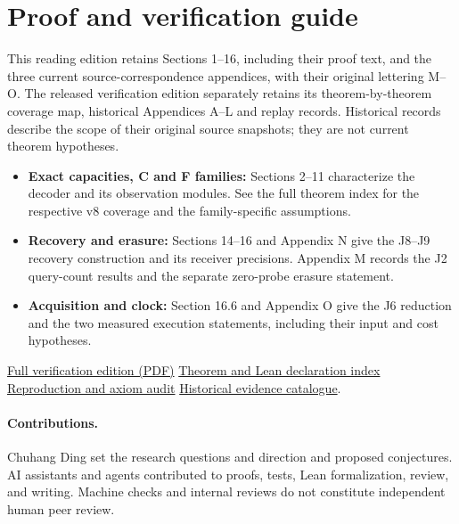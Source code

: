 \documentclass[
  11pt,
]{article}
\begin{document}
\section{Proof and verification guide}\label{paper6-current-coverage}
This reading edition retains Sections 1--16, including their proof text,
and the three current source-correspondence appendices, with their
original lettering M--O. The released verification edition separately
retains its theorem-by-theorem coverage map, historical Appendices A--L
and replay records. Historical records describe the scope of their
original source snapshots; they are not current theorem hypotheses.

\begin{itemize}
\item \textbf{Exact capacities, C and F families:} Sections 2--11
  characterize the decoder and its observation modules. See the full
  theorem index for the respective v8 coverage and the family-specific
  assumptions.
\item \textbf{Recovery and erasure:} Sections 14--16 and Appendix N give
  the J8--J9 recovery construction and its receiver precisions. Appendix
  M records the J2 query-count results and the separate zero-probe
  erasure statement.
\item \textbf{Acquisition and clock:} Section 16.6 and Appendix O give
  the J6 reduction and the two measured execution statements, including
  their input and cost hypotheses.
\end{itemize}

\noindent\href{https://github.com/dch-and-Elara/some-research-inspired-by-openais-eth-preprint/blob/ebab675ea9d4330e8f62db9c83e8e3692f77dc0e/checked-retained-execution/paper/Paper6.pdf}{Full verification edition (PDF)}
\quad\href{https://github.com/dch-and-Elara/some-research-inspired-by-openais-eth-preprint/blob/ebab675ea9d4330e8f62db9c83e8e3692f77dc0e/checked-retained-execution/THEOREMS.md}{Theorem and Lean declaration index}
\quad\href{https://github.com/dch-and-Elara/some-research-inspired-by-openais-eth-preprint/blob/ebab675ea9d4330e8f62db9c83e8e3692f77dc0e/checked-retained-execution/VERIFICATION.md}{Reproduction and axiom audit}
\quad\href{https://github.com/dch-and-Elara/some-research-inspired-by-openais-eth-preprint/blob/ebab675ea9d4330e8f62db9c83e8e3692f77dc0e/checked-retained-execution/paper/EVIDENCE_CATALOG.md}{Historical evidence catalogue}.

\paragraph*{Contributions.}
Chuhang Ding set the research questions and direction and proposed conjectures.
AI assistants and agents contributed to proofs, tests, Lean formalization, review,
and writing. Machine checks and internal reviews do not constitute independent
human peer review.
\end{document}
